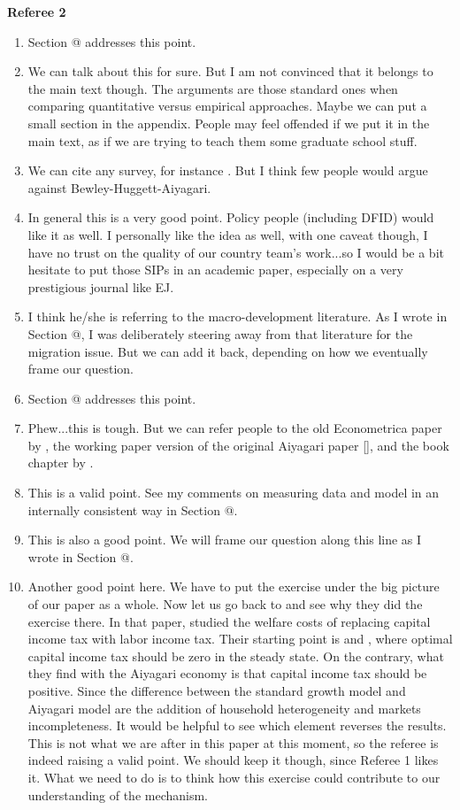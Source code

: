 \documentclass[twoside,11pt,leqno]{article}
\makeatletter
\newcommand*{\rom}[1]{\expandafter\@slowromancap\romannumeral #1@}
\makeatother
\begin{document}
\begin{flushleft}
\textbf{Referee 2}
\end{flushleft}
\begin{enumerate}
    \item
    Section \rom{1} addresses this point.
    \item
    We can talk about this for sure. But I am not convinced that it belongs to the main text though. The arguments are those standard ones when comparing quantitative versus empirical approaches. Maybe we can put a small section in the appendix. People may feel offended if we put it in the main text, as if we are trying to teach them some graduate school stuff.
    \item
    We can cite any survey, for instance \citet{Heathcoteetal:2009}. But I think few people would argue against Bewley-Huggett-Aiyagari.
    \item
    In general this is a very good point. Policy people (including DFID) would like it as well. I personally like the idea as well, with one caveat though, I have no trust on the quality of our country team's work...so I would be a bit hesitate to put those SIPs in an academic paper, especially on a very prestigious journal like EJ.
    \item
    I think he/she is referring to the macro-development literature. As I wrote in Section \rom{1}, I was deliberately steering away from that literature for the migration issue. But we can add it back, depending on how we eventually frame our question.
    \item
    Section \rom{1} addresses this point.
    \item
    Phew...this is tough. But we can refer people to the old Econometrica paper by \citet{HopenhaynPrescott:1992}, the working paper version of the original Aiyagari paper [\citet{Aiyagari:1993}], and the book chapter by \citet{RiosRull:1999}.
    \item
    This is a valid point. See my comments on measuring data and model in an internally consistent way in Section \rom{2}.
    \item
    This is also a good point. We will frame our question along this line as I wrote in Section \rom{1}.
    \item
    Another good point here. We have to put the exercise under the big picture of our paper as a whole. Now let us go back to \citet{DomeijHeathcote:2004} and see why they did the exercise there. In that paper, \citet{DomeijHeathcote:2004} studied the welfare costs of replacing capital income tax with labor income tax. Their starting point is \citet{Chamley:1986} and \citet{Judd:1985}, where optimal capital income tax should be zero in the steady state. On the contrary, what they find with the Aiyagari economy is that capital income tax should be positive. Since the difference between the standard growth model and Aiyagari model are the addition of household heterogeneity and markets incompleteness. It would be helpful to see which element reverses the results. This is not what we are after in this paper at this moment, so the referee is indeed raising a valid point. We should keep it though, since Referee 1 likes it. What we need to do is to think how this exercise could contribute to our understanding of the mechanism.

\end{enumerate}
\end{document}

